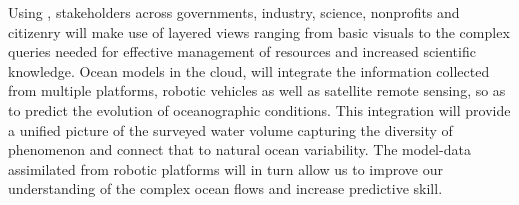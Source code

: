 \documentclass[12pt]{article}
\begin{document}
Using \proe, stakeholders across governments, industry, science,
nonprofits and citizenry will make use of layered views ranging from
basic visuals to the complex queries needed for effective management
of resources and increased scientific knowledge.  Ocean models in the
cloud, will integrate the information collected from multiple
platforms, robotic vehicles as well as satellite remote sensing, so as
to predict the evolution of oceanographic conditions. This integration
will provide a unified picture of the surveyed water volume capturing
the diversity of phenomenon and connect that to natural ocean
variability. The model-data assimilated from robotic platforms will in
turn allow us to improve our understanding of the complex ocean flows
and increase predictive skill.



\end{document}
